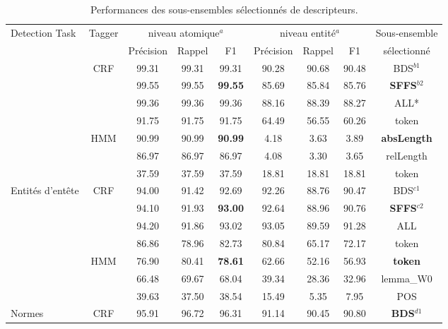 \begin{table}[!h]
\scriptsize
\caption{Performances des sous-ensembles sélectionnés de descripteurs.}\label{fig:structuration:select-feats}
\begin{center}
\begin{tabular}{l|c|ccc|ccc|c}
\hline\noalign{\smallskip}
Detection Task & Tagger & \multicolumn{3}{c}{niveau atomique$^a$} & \multicolumn{3}{c}{niveau entité$^a$}& Sous-ensemble \\
 & & Précision & Rappel & F1 &  Précision & Rappel & F1 & sélectionné\\
\noalign{\smallskip}\hline\noalign{\smallskip}
\multirow{7}{*}{Sections} 		& \multirow{4}{*}{CRF} & 99.31 & 99.31 & 99.31 & 90.28 & 90.68 & 90.48 & BDS$^{b1}$  \\
  				&  & 99.55 & 99.55 & \textbf{99.55} & 85.69 & 85.84 & 85.76 & \textbf{SFFS}$^{b2}$ \\
                &  & 99.36 & 99.36 & 99.36 & 88.16 & 88.39 & 88.27 & ALL* \\
                &  & 91.75 & 91.75 & 91.75 & 64.49 & 56.55 & 60.26 & token \\  \cline{2-9}
                 & \multirow{3}{*}{HMM} & 90.99 & 90.99 & \textbf{90.99}  & 4.18 & 3.63 & 3.89 & \textbf{absLength} \\ 
 & & 86.97 & 86.97 & 86.97 & 4.08 & 3.30 & 3.65 & relLength \\   
  &  & 37.59 & 37.59 & 37.59  & 18.81 & 18.81 & 18.81 & token \\ \hline
\multirow{7}{*}{Entités d'entête}	& \multirow{4}{*}{CRF} & 94.00 & 91.42 & 92.69 & 92.26 & 88.76 & 90.47 & BDS$^{c1}$  \\
				&  & 94.10 & 91.93 & \textbf{93.00} & 92.64 & 88.96 & 90.76 & \textbf{SFFS}$^{c2}$  \\ 
                &  & 94.20 & 91.86 & 93.02 & 93.05 & 89.59 & 91.28 & ALL \\
                &  & 86.86 & 78.96 & 82.73 & 80.84 & 65.17 & 72.17 & token \\ \cline{2-9}
                  &  \multirow{3}{*}{HMM}  & 76.90 & 80.41 & \textbf{78.61} & 62.66 & 52.16 & 56.93 &  \textbf{token} \\ 
  &    & 66.48 & 69.67 & 68.04 & 39.34 & 28.36 & 32.96 &  lemma\_W0 \\ 
  &    & 39.63 & 37.50 & 38.54 & 15.49 & 5.35 & 7.95 &  POS \\ \hline
\multirow{6}{*}{Normes} 			& \multirow{4}{*}{CRF} & 95.91 & 96.72 & 96.31 & 91.14 & 90.45 & 90.80 & \textbf{BDS}$^{d1}$ \\ 

\end{tabular}
\end{center}
\end{table}
